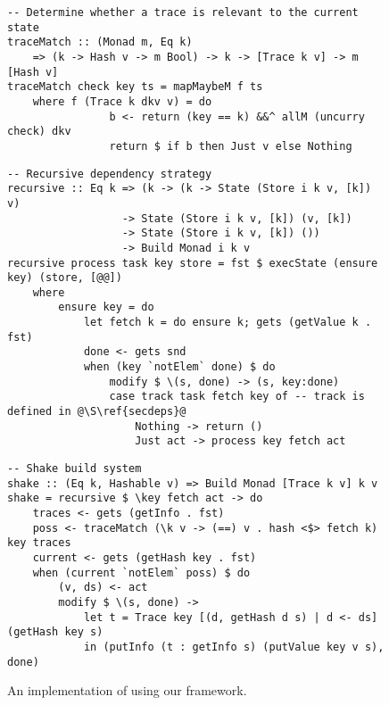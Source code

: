 \begin{figure}
\begin{verbatim}
-- Determine whether a trace is relevant to the current state
traceMatch :: (Monad m, Eq k)
    => (k -> Hash v -> m Bool) -> k -> [Trace k v] -> m [Hash v]
traceMatch check key ts = mapMaybeM f ts
    where f (Trace k dkv v) = do
                b <- return (key == k) &&^ allM (uncurry check) dkv
                return $ if b then Just v else Nothing
\end{verbatim}
\vspace{1mm}
\begin{verbatim}
-- Recursive dependency strategy
recursive :: Eq k => (k -> (k -> State (Store i k v, [k]) v)
                  -> State (Store i k v, [k]) (v, [k])
                  -> State (Store i k v, [k]) ())
                  -> Build Monad i k v
recursive process task key store = fst $ execState (ensure key) (store, [@@])
    where
        ensure key = do
            let fetch k = do ensure k; gets (getValue k . fst)
            done <- gets snd
            when (key `notElem` done) $ do
                modify $ \(s, done) -> (s, key:done)
                case track task fetch key of -- track is defined in @\S\ref{secdeps}@
                    Nothing -> return ()
                    Just act -> process key fetch act
\end{verbatim}
\vspace{1mm}
\begin{verbatim}
-- Shake build system
shake :: (Eq k, Hashable v) => Build Monad [Trace k v] k v
shake = recursive $ \key fetch act -> do
    traces <- gets (getInfo . fst)
    poss <- traceMatch (\k v -> (==) v . hash <$> fetch k) key traces
    current <- gets (getHash key . fst)
    when (current `notElem` poss) $ do
        (v, ds) <- act
        modify $ \(s, done) ->
            let t = Trace key [(d, getHash d s) | d <- ds] (getHash key s)
            in (putInfo (t : getInfo s) (putValue key v s), done)

\end{verbatim}
\vspace{-3mm}
\caption{An implementation of \Shake using our framework.}\label{fig-shake-implementation}
\vspace{1mm}
\end{figure}

\subsection{\Bazel}\label{sec-implementation-bazel}

